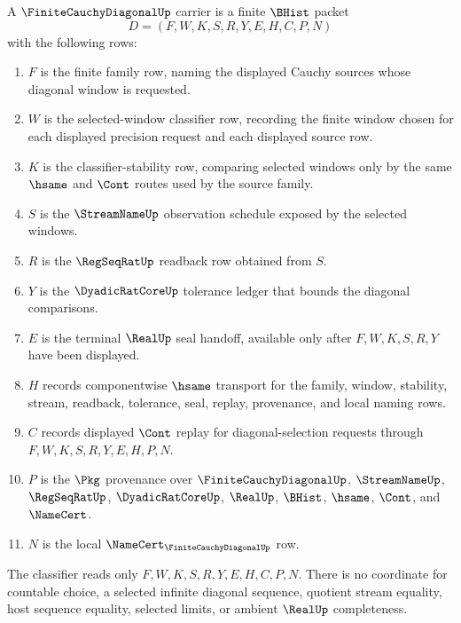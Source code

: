 \begin{definition}
\label{def:finite-cauchy-diagonal-carrier}
A $\FiniteCauchyDiagonalUp$ carrier is a finite $\BHist$ packet
$$
D=(F,W,K,S,R,Y,E,H,C,P,N)
$$
with the following rows:
\begin{enumerate}
\item $F$ is the finite family row, naming the displayed Cauchy sources whose diagonal window is requested.
\item $W$ is the selected-window classifier row, recording the finite window chosen for each displayed precision request and each displayed source row.
\item $K$ is the classifier-stability row, comparing selected windows only by the same $\hsame$ and $\Cont$ routes used by the source family.
\item $S$ is the $\StreamNameUp$ observation schedule exposed by the selected windows.
\item $R$ is the $\RegSeqRatUp$ readback row obtained from $S$.
\item $Y$ is the $\DyadicRatCoreUp$ tolerance ledger that bounds the diagonal comparisons.
\item $E$ is the terminal $\RealUp$ seal handoff, available only after $F,W,K,S,R,Y$ have been displayed.
\item $H$ records componentwise $\hsame$ transport for the family, window, stability, stream, readback, tolerance, seal, replay, provenance, and local naming rows.
\item $C$ records displayed $\Cont$ replay for diagonal-selection requests through $F,W,K,S,R,Y,E,H,P,N$.
\item $P$ is the $\Pkg$ provenance over $\FiniteCauchyDiagonalUp$, $\StreamNameUp$, $\RegSeqRatUp$, $\DyadicRatCoreUp$, $\RealUp$, $\BHist$, $\hsame$, $\Cont$, and $\NameCert$.
\item $N$ is the local $\NameCert_{\FiniteCauchyDiagonalUp}$ row.
\end{enumerate}
The classifier reads only $F,W,K,S,R,Y,E,H,C,P,N$. There is no coordinate for countable choice, a selected infinite diagonal sequence, quotient stream equality, host sequence equality, selected limits, or ambient $\RealUp$ completeness.
\end{definition}

